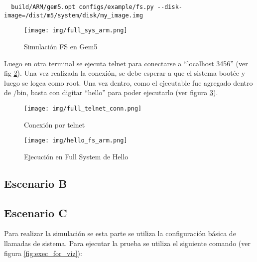 \documentclass {article}
\begin{document}
\begin{lstlisting}
  build/ARM/gem5.opt configs/example/fs.py --disk-image=/dist/m5/system/disk/my_image.img
\end{lstlisting}

\begin{figure}[H]
  \centering
  \texttt{[image: img/full\_sys\_arm.png]}
  \caption{\label{fig:arm_full_gem5} Simulación FS en Gem5}
\end{figure}

Luego en otra terminal se ejecuta telnet para conectarse a ``localhost 3456'' (ver fig
\ref{fig:telnet}). Una vez realizada la
conexión, se debe esperar a que el sistema bootée y luego se logea como root. Una vez dentro, como
el ejecutable fue agregado dentro de /bin, basta con digitar ``hello'' para poder ejecutarlo (ver
figura \ref{fig:hello_fs}).

\begin{figure}[H]
  \centering
  \texttt{[image: img/full\_telnet\_conn.png]}
  \caption{\label{fig:telnet} Conexión por telnet}
\end{figure}

\begin{figure}[H]
  \centering
  \texttt{[image: img/hello\_fs\_arm.png]}
  \caption{\label{fig:hello_fs} Ejecución en Full System de Hello}
\end{figure}

\subsection{Escenario B}

\subsection{Escenario C}

Para realizar la simulación se esta parte se utiliza la configuración básica de llamadas de
sistema. Para ejecutar la prueba se utiliza el siguiente comando (ver figura \ref{fig:exec_for_viz}):
\end{document}
